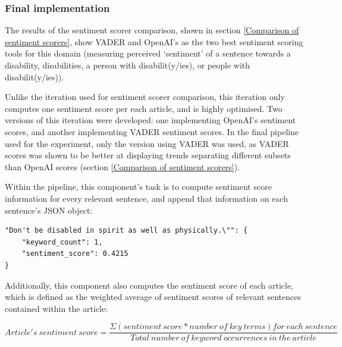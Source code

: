 \documentclass{report}
\begin{document}
\subsubsection{Final implementation} \label{des-sentiment-final}

The results of the sentiment scorer comparison, shown in section \ref{Comparison of sentiment scorers}, show VADER \cite{VADER} and OpenAI's \cite{OpenAI} as the two best sentiment scoring tools for this domain (measuring perceived `sentiment' of a sentence towards a disability, disabilities, a person with disabilit(y/ies), or people with disabilit(y/ies)).

Unlike the iteration used for sentiment scorer comparison, this iteration only computes one sentiment score per each article, and is highly optimised.
Two versions of this iteration were developed: one implementing OpenAI's sentiment scores, and another implementing VADER sentiment scores.
In the final pipeline used for the experiment, only the version using VADER was used, as VADER scores was shown to be better at displaying trends separating different subsets than OpenAI scores (section \ref{Comparison of sentiment scorers}).

Within the pipeline, this component's task is to compute sentiment score information for every relevant sentence, and append that information on each sentence's JSON object:
\begin{lstlisting}
"Don't be disabled in spirit as well as physically.\"": {
	"keyword_count": 1,
	"sentiment_score": 0.4215
}
\end{lstlisting}
Additionally, this component also computes the sentiment score of each article, which is defined as the weighted average of sentiment scores of relevant sentences contained within the article:

\begin{center}
	$Article's \ sentiment \ score = \dfrac{\Sigma (sentiment \ score * number \ of \ key \ terms) for \ each \ sentence}{Total \ number \ of \ keyword \ occurrences \ in \ the \ article}$
\end{center}
\end{document}

